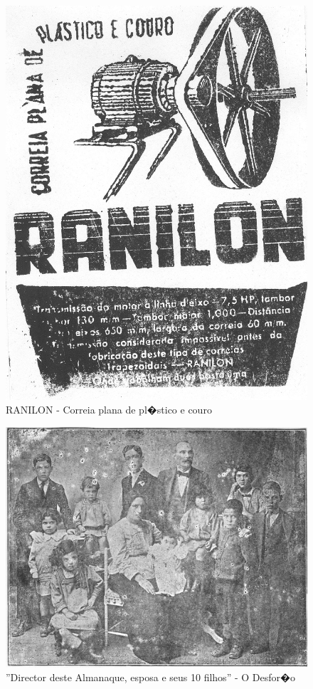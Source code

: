 \documentclass[a4paper,titlepage]{article}
\begin{document}
\begin{figure}[H]
\centering
\includegraphics[scale=0.4]{imagens/004.jpg}
\caption{RANILON - Correia plana de pl�stico e couro}
\end{figure}

\begin{figure}[H]
\centering
\includegraphics[scale=0.6]{imagens/0059.jpg}
\caption{''Director deste Almanaque, esposa e seus 10 filhos'' - O Desfor�o }
\end{figure}
\end{document}
